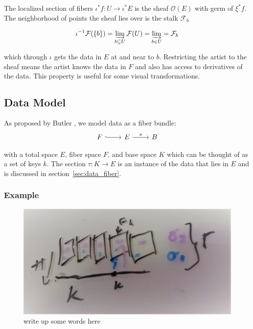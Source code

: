 \documentclass[../main.tex]{subfiles}
\begin{document}
The localized section of fibers $\iota^*f: U \rightarrow \iota^*E$ is the sheaf $\mathcal{O}(E)$ with germ of $\xi^*f$. The neighborhood of points the sheaf lies over is the stalk $\mathcal{F}_b$ \cite{StalkSheaf2019,spanier1989algebraic}

\begin{equation}
    \label{eq:stalk}
    \iota^{-1}\mathcal{F}(\{b\}) = \varinjlim_{b\subseteq U}\mathcal{F}(U) =  \varinjlim_{b \in U} = \mathcal{F}_b 
\end{equation}

which through $\iota$ gets the data in $E$ at and near to $b$. Restricting the artist to the sheaf means the artist knows the data in $F$ and also has access to derivatives of the data. This property is useful for some visual transformations. 

\subsection{Data Model}
As proposed by Butler \cite{butlerVectorBundleClassesForm1992,butlerVisualizationModelBased1989}, we model data as a fiber bundle:
\begin{equation}
    \label{eq:data_fiber_bundle}
    \begin{tikzcd}
        F \arrow[r, hook] & E \arrow[r, "\pi"] & B
    \end{tikzcd}
\end{equation}

with a total space $E$, fiber space $F$, and base space $K$ which can be thought of as a set of keys $k$. The section $\tau:K \rightarrow E$ is an instance of the data that lies in $E$ and is discussed in section~\ref{sec:data_fiber}. 

\subsubsection{Example}

\begin{figure}[ht]
    \label{fig:data_fiber_bundle}
    \includegraphics[width=.2\linewidth]{figures/sections/math/fiberbundle.png}
    \caption{write up some words here}
\end{figure}
\end{document}
